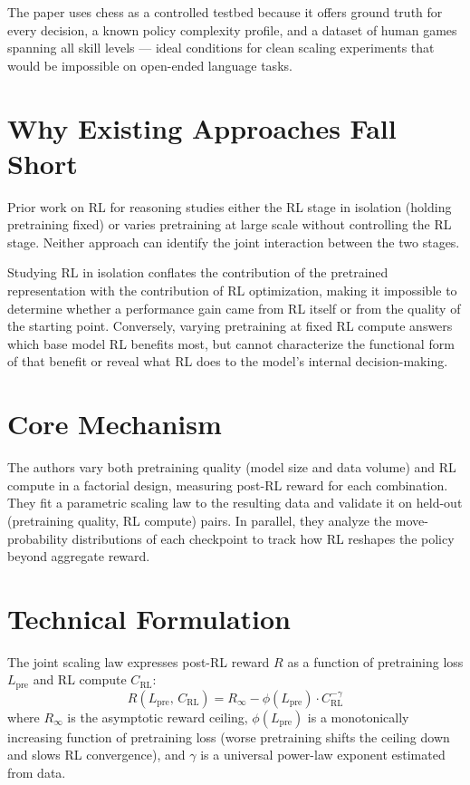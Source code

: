 \documentclass[10pt,twocolumn]{article}
\begin{document}
The paper uses chess as a controlled testbed because it offers ground
truth for every decision, a known policy complexity profile, and
a dataset of human games spanning all skill levels ---
ideal conditions for clean scaling experiments that would be
impossible on open-ended language tasks.

\section{Why Existing Approaches Fall Short}

Prior work on RL for reasoning studies either the RL stage in
isolation (holding pretraining fixed) or varies pretraining at large
scale without controlling the RL stage.
Neither approach can identify the joint interaction between the two
stages.

Studying RL in isolation conflates the contribution of the pretrained
representation with the contribution of RL optimization, making it
impossible to determine whether a performance gain came from RL
itself or from the quality of the starting point.
Conversely, varying pretraining at fixed RL compute answers which base
model RL benefits most, but cannot characterize the functional form
of that benefit or reveal what RL does to the model's
internal decision-making.

\section{Core Mechanism}

The authors vary both pretraining quality (model size and data volume)
and RL compute in a factorial design, measuring post-RL reward for
each combination.
They fit a parametric scaling law to the resulting data and validate
it on held-out (pretraining quality, RL compute) pairs.
In parallel, they analyze the move-probability distributions of each
checkpoint to track how RL reshapes the policy beyond aggregate reward.

\section{Technical Formulation}

The joint scaling law expresses post-RL reward $R$ as a function of
pretraining loss $L_{\text{pre}}$ and RL compute $C_{\text{RL}}$:
\[
R(L_{\text{pre}},\, C_{\text{RL}})
  = R_\infty - \phi(L_{\text{pre}}) \cdot C_{\text{RL}}^{-\gamma}
\]
where $R_\infty$ is the asymptotic reward ceiling, $\phi(L_{\text{pre}})$
is a monotonically increasing function of pretraining loss
(worse pretraining shifts the ceiling down and slows RL convergence),
and $\gamma$ is a universal power-law exponent estimated from data.
\end{document}
